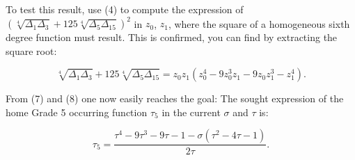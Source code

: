 \documentclass{article}
\begin{document}
To test this result, use (4) to compute the expression of $(\sqrt[4]{\Delta_1\Delta_3}+125\sqrt[4]{\Delta_5\Delta_{15}})^2$ in $z_0$, $z_1$, where the square of a homogeneous sixth degree function must result. This is confirmed, you can find by extracting the square root:

\begin{equation}
  \sqrt[4]{\Delta_1\Delta_3}+125\sqrt[4]{\Delta_5\Delta_{15}}=z_0 z_1(z_0^4-9z_0^3z_1-9z_0z_1^3-z_1^4).
\end{equation}

From (7) and (8) one now easily reaches the goal: The sought expression of the home Grade 5 occurring function $\tau_5$ in the current $\sigma$ and $\tau$ is:

\begin{equation}
  \tau_5=\frac{\tau^4-9\tau^3-9\tau-1-\sigma(\tau^2-4\tau-1)}{2\tau}.
\end{equation}
\end{document}
